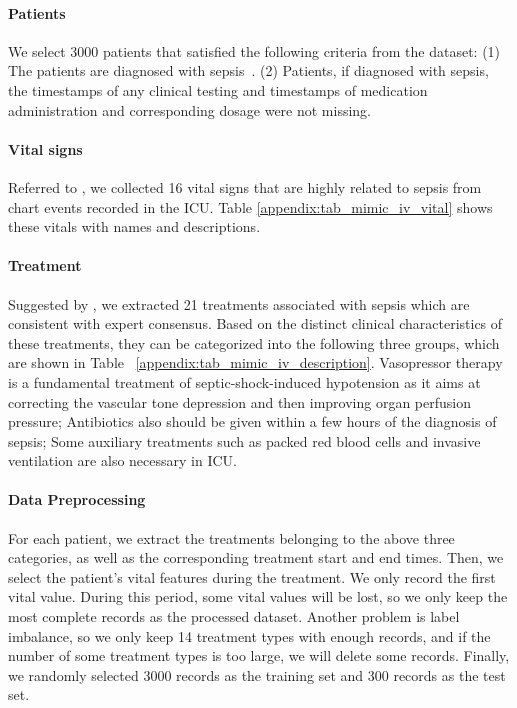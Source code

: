 \documentclass{article} %
\begin{document}
\paragraph{Patients} We select 3000 patients that satisfied the following criteria from the dataset: (1) The patients are diagnosed with sepsis~\citep{saria2018individualized}. (2) Patients, if diagnosed with sepsis, the timestamps of any clinical testing and timestamps of medication administration and corresponding dosage were not missing.

\paragraph{Vital signs} Referred to \citep{komorowski2018artificial}, we collected 16 vital signs that are highly related to sepsis from chart events recorded in the ICU. Table \ref{appendix:tab_mimic_iv_vital} shows these vitals with names and descriptions. 

\paragraph{Treatment} Suggested by \citep{komorowski2018artificial}, we extracted 21 treatments associated with sepsis which are consistent with expert consensus. Based on the distinct clinical characteristics of these treatments, they can be categorized into the following three groups, which are shown in Table ~\ref{appendix:tab_mimic_iv_description}. Vasopressor therapy is a fundamental treatment of septic-shock-induced hypotension as it aims at correcting the vascular tone depression and then improving organ perfusion pressure; Antibiotics also should be given within a few hours of the diagnosis of sepsis; Some auxiliary treatments such as packed red blood cells and invasive ventilation are also necessary in ICU.

\paragraph{Data Preprocessing} 
For each patient, we extract the treatments belonging to the above three categories, as well as the corresponding treatment start and end times. Then, we select the patient's vital features during the treatment. We only record the first vital value. During this period, some vital values will be lost, so we only keep the most complete records as the processed dataset. Another problem is label imbalance, so we only keep 14 treatment types with enough records, and if the number of some treatment types is too large, we will delete some records. Finally, we randomly selected 3000 records as the training set and 300 records as the test set.
\end{document}
